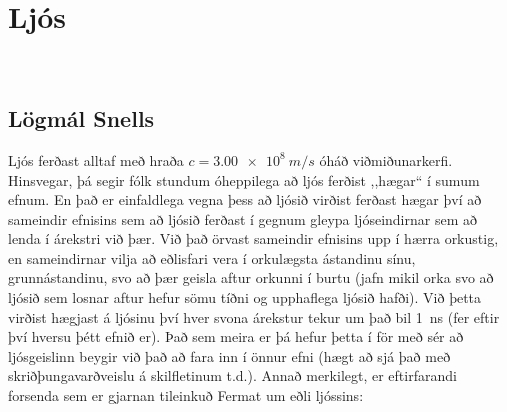 \ifdefined \wholebook \else\documentclass[oneside]{book}\usepackage{EdlBook}\graphicspath{{figures/}}
\begin{document}
%
\setcounter{chapter}{22} %
%
\fi

\renewcommand{\thefigure}{\arabic{figure}}


\chapter{Ljós}

\begin{tcolorbox}

 \\

\vspace{-0.5cm}
\end{tcolorbox}


\section{Lögmál Snells}

Ljós ferðast alltaf með hraða $c = \SI{3.00e8}{m/s}$ óháð viðmiðunarkerfi. Hinsvegar, þá segir fólk stundum óheppilega að ljós ferðist ,,hægar`` í sumum efnum. En það er einfaldlega vegna þess að ljósið virðist ferðast hægar því að sameindir efnisins sem að ljósið ferðast í gegnum gleypa ljóseindirnar sem að lenda í árekstri við þær. Við það örvast sameindir efnisins upp í hærra orkustig, en sameindirnar vilja að eðlisfari vera í orkulægsta ástandinu sínu, grunnástandinu, svo að þær geisla aftur orkunni í burtu (jafn mikil orka svo að ljósið sem losnar aftur hefur sömu tíðni og upphaflega ljósið hafði). Við þetta virðist hægjast á ljósinu því hver svona árekstur tekur um það bil \SI{1}{ns} (fer eftir því hversu þétt efnið er). Það sem meira er þá hefur þetta í för með sér að ljósgeislinn beygir við það að fara inn í önnur efni (hægt að sjá það með skriðþungavarðveislu á skilfletinum t.d.). Annað merkilegt, er eftirfarandi forsenda sem er gjarnan tileinkuð Fermat um eðli ljóssins:
\end{document}
